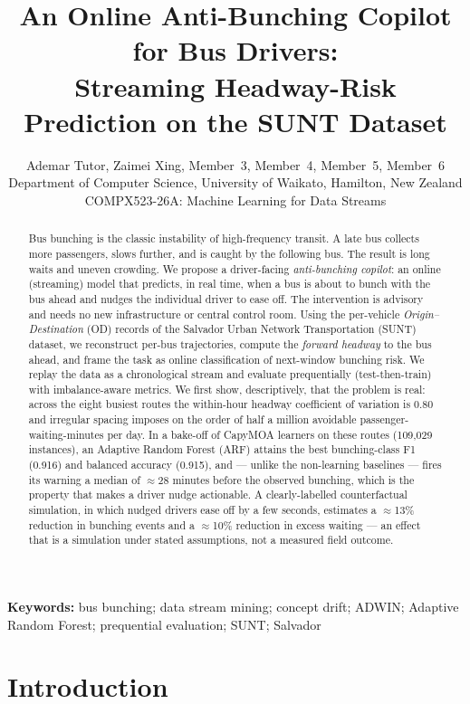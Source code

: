 \documentclass[11pt,a4paper]{article}
\title{An Online Anti-Bunching Copilot for Bus Drivers:\\
Streaming Headway-Risk Prediction on the SUNT Dataset}
\author{Ademar Tutor, Zaimei Xing, Member~3, Member~4, Member~5, Member~6 \\
\small Department of Computer Science, University of Waikato, Hamilton, New Zealand \\
\small COMPX523-26A: Machine Learning for Data Streams}
\date{}
\begin{document}
\maketitle

\begin{abstract}
Bus bunching is the classic instability of high-frequency transit. A late bus collects
more passengers, slows further, and is caught by the following bus. The result is long
waits and uneven crowding. We propose a driver-facing
\emph{anti-bunching copilot}: an online (streaming) model that predicts, in real time,
when a bus is about to bunch with the bus ahead and nudges the individual driver to ease
off. The intervention is advisory and needs no new infrastructure or central control room.
Using the per-vehicle \emph{Origin--Destination} (OD) records of the Salvador Urban Network
Transportation (SUNT) dataset, we reconstruct per-bus trajectories, compute the
\emph{forward headway} to the bus ahead, and frame the task as online classification of
next-window bunching risk. We replay the data as a chronological stream and evaluate
prequentially (test-then-train) with imbalance-aware metrics. We first show, descriptively,
that the problem is real: across the eight busiest routes the within-hour headway coefficient
of variation is $0.80$ and irregular spacing imposes on the order of half a million avoidable
passenger-waiting-minutes per day. In a bake-off of CapyMOA learners on these routes
(109{,}029 instances), an Adaptive Random Forest (ARF) attains the best bunching-class F1
(0.916) and balanced accuracy (0.915), and --- unlike the non-learning baselines --- fires its
warning a median of $\approx$28 minutes before the observed bunching, which is the property
that makes a driver nudge actionable. A clearly-labelled counterfactual simulation, in which
nudged drivers ease off by a few seconds, estimates a $\approx$13\% reduction in bunching
events and a $\approx$10\% reduction in excess waiting --- an effect that is a simulation under
stated assumptions, not a measured field outcome.
\end{abstract}

\medskip
\noindent\textbf{Keywords:} bus bunching; data stream mining; concept drift; ADWIN;
Adaptive Random Forest; prequential evaluation; SUNT; Salvador

\clearpage

\section{Introduction}
\label{sec:intro}
\end{document}
